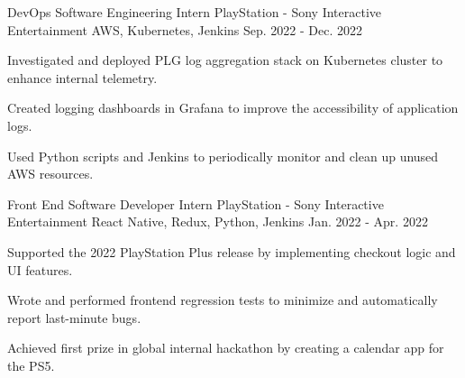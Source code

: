 

\begin{cventries}

  \cventry
    {DevOps Software Engineering Intern} %
    {PlayStation - Sony Interactive Entertainment} %
    {AWS, Kubernetes, Jenkins} %
    {Sep. 2022 - Dec. 2022} %
    {
      \begin{cvitems} %
        \item {Investigated and deployed PLG log aggregation stack on Kubernetes cluster to enhance internal telemetry.}
        \item {Created logging dashboards in Grafana to improve the accessibility of application logs.}
        \item {Used Python scripts and Jenkins to periodically monitor and clean up unused AWS resources.}
      \end{cvitems}
    }

  \cventry
    {Front End Software Developer Intern} %
    {PlayStation - Sony Interactive Entertainment} %
    {React Native, Redux, Python, Jenkins} %
    {Jan. 2022 - Apr. 2022} %
    {
      \begin{cvitems} %
        \item {Supported the 2022 PlayStation Plus release by implementing checkout logic and UI features.}
        \item {Wrote and performed frontend regression tests to minimize and automatically report last-minute bugs.} 
        \item {Achieved first prize in global internal hackathon by creating a calendar app for the PS5.}
      \end{cvitems}
    }



\end{cventries}
